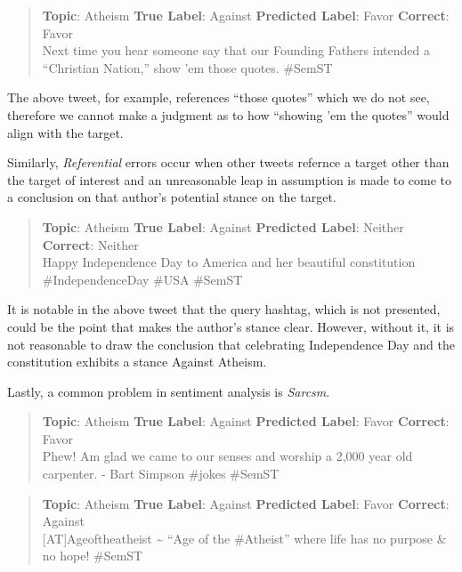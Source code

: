 \documentclass[]{article}
\begin{document}
\begin{quote}
\textbf{Topic}: Atheism \textbar{} \textbf{True Label}: Against
\textbar{} \textbf{Predicted Label}: Favor \textbar{} \textbf{Correct}:
Favor\\
Next time you hear someone say that our Founding Fathers intended a
``Christian Nation,'' show 'em those quotes. \#SemST
\end{quote}

The above tweet, for example, references ``those quotes'' which we do
not see, therefore we cannot make a judgment as to how ``showing 'em the
quotes'' would align with the target.

Similarly, \emph{Referential} errors occur when other tweets refernce a
target other than the target of interest and an unreasonable leap in
assumption is made to come to a conclusion on that author's potential
stance on the target.

\begin{quote}
\textbf{Topic}: Atheism \textbar{} \textbf{True Label}: Against
\textbar{} \textbf{Predicted Label}: Neither \textbar{}
\textbf{Correct}: Neither\\
Happy Independence Day to America and her beautiful constitution
\#IndependenceDay \#USA \#SemST
\end{quote}

It is notable in the above tweet that the query hashtag, which is not
presented, could be the point that makes the author's stance clear.
However, without it, it is not reasonable to draw the conclusion that
celebrating Independence Day and the constitution exhibits a stance
Against Atheism.

Lastly, a common problem in sentiment analysis is \emph{Sarcsm}.

\begin{quote}
\textbf{Topic}: Atheism \textbar{} \textbf{True Label}: Against
\textbar{} \textbf{Predicted Label}: Favor \textbar{} \textbf{Correct}:
Favor\\
Phew! Am glad we came to our senses and worship a 2,000 year old
carpenter. - Bart Simpson \#jokes \#SemST
\end{quote}

\begin{quote}
\textbf{Topic}: Atheism \textbar{} \textbf{True Label}: Against
\textbar{} \textbf{Predicted Label}: Favor \textbar{} \textbf{Correct}:
Against\\
{[}AT{]}Ageoftheatheist \textasciitilde{} ``Age of the \#Atheist'' where
life has no purpose \& no hope! \#SemST
\end{quote}
\end{document}

